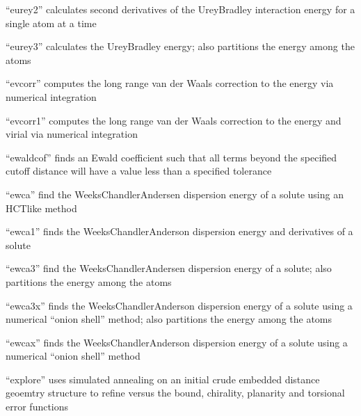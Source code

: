\documentclass[letterpaper,11pt,english]{sphinxmanual}
\begin{document}

“eurey2” calculates second derivatives of the Urey\sphinxhyphen{}Bradley
interaction energy for a single atom at a time


“eurey3” calculates the Urey\sphinxhyphen{}Bradley energy; also
partitions the energy among the atoms


“evcorr” computes the long range van der Waals correction
to the energy via numerical integration


“evcorr1” computes the long range van der Waals correction
to the energy and virial via numerical integration


“ewaldcof” finds an Ewald coefficient such that all terms
beyond the specified cutoff distance will have a value less
than a specified tolerance


“ewca” find the Weeks\sphinxhyphen{}Chandler\sphinxhyphen{}Andersen dispersion energy
of a solute using an HCT\sphinxhyphen{}like method


“ewca1” finds the Weeks\sphinxhyphen{}Chandler\sphinxhyphen{}Anderson dispersion energy
and derivatives of a solute


“ewca3” find the Weeks\sphinxhyphen{}Chandler\sphinxhyphen{}Andersen dispersion energy
of a solute; also partitions the energy among the atoms


“ewca3x” finds the Weeks\sphinxhyphen{}Chandler\sphinxhyphen{}Anderson dispersion energy
of a solute using a numerical “onion shell” method; also
partitions the energy among the atoms


“ewcax” finds the Weeks\sphinxhyphen{}Chandler\sphinxhyphen{}Anderson dispersion energy
of a solute using a numerical “onion shell” method


“explore” uses simulated annealing on an initial crude
embedded distance geoemtry structure to refine versus the
bound, chirality, planarity and torsional error functions
\end{document}
